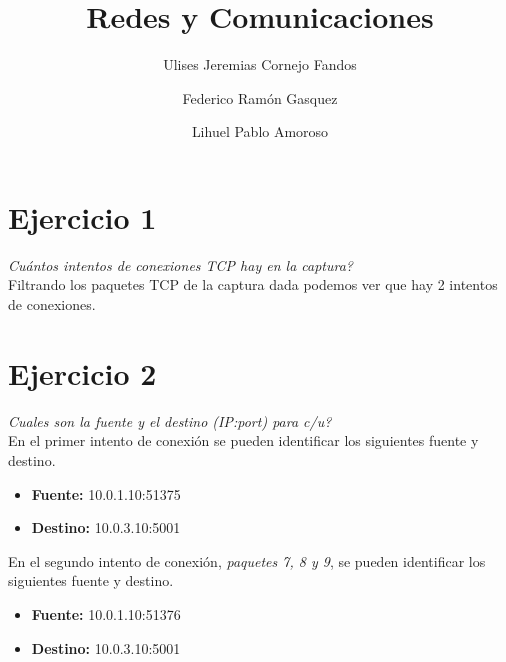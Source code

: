 \documentclass[osajnl,twocolumn,showpacs,superscriptaddress,10pt]{revtex4-1} %
\begin{document}
\title{Redes y Comunicaciones}

\author{Ulises Jeremias Cornejo Fandos}

\author{Federico Ramón Gasquez}

\author{Lihuel Pablo Amoroso}


\maketitle %

\onecolumngrid

\section{Ejercicio 1}

\textit{Cuántos intentos de conexiones TCP hay en la captura?} \\

Filtrando los paquetes TCP de la captura dada podemos ver que hay 2 intentos de conexiones.

\section{Ejercicio 2}

\textit{Cuales son la fuente y el destino (IP:port) para c/u?} \\

En el primer intento de conexión se pueden identificar los siguientes fuente y destino.

\begin{itemize}
    \item \textbf{Fuente:} 10.0.1.10:51375
    \item \textbf{Destino:} 10.0.3.10:5001
\end{itemize}

En el segundo intento de conexión, \textit{paquetes 7, 8 y 9}, se pueden identificar los siguientes fuente y destino.

\begin{itemize}
    \item \textbf{Fuente:} 10.0.1.10:51376
    \item \textbf{Destino:} 10.0.3.10:5001
\end{itemize}
\end{document}
